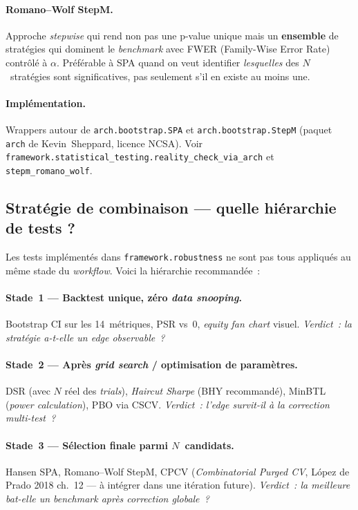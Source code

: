\paragraph{Romano--Wolf StepM.} Approche \emph{stepwise} qui rend non pas une p-value unique mais un \textbf{ensemble} de stratégies qui dominent le \emph{benchmark} avec FWER (Family-Wise Error Rate) contrôlé à $\alpha$. Préférable à SPA quand on veut identifier \emph{lesquelles} des $N$~stratégies sont significatives, pas seulement s'il en existe au moins une.

\paragraph{Implémentation.} Wrappers autour de \texttt{arch.bootstrap.SPA} et \texttt{arch.bootstrap.StepM} (paquet \texttt{arch} de Kevin~Sheppard, licence NCSA). Voir \texttt{framework.statistical\_testing.reality\_check\_via\_arch} et \texttt{stepm\_romano\_wolf}.

\subsection{Stratégie de combinaison --- quelle hiérarchie de tests ?}
\label{app:hierarchy}

Les tests implémentés dans \texttt{framework.robustness} ne sont pas tous appliqués au même stade du \emph{workflow}. Voici la hiérarchie recommandée~:

\paragraph{Stade~1 --- Backtest unique, zéro \emph{data snooping}.} Bootstrap CI sur les 14~métriques, PSR vs~0, \emph{equity fan chart} visuel. \textit{Verdict~: la stratégie a-t-elle un \emph{edge} observable~?}

\paragraph{Stade~2 --- Après \emph{grid search} / optimisation de paramètres.} DSR (avec $N$ réel des \emph{trials}), \emph{Haircut Sharpe} (BHY recommandé), MinBTL (\emph{power calculation}), PBO via CSCV. \textit{Verdict~: l'\emph{edge} survit-il à la correction multi-test~?}

\paragraph{Stade~3 --- Sélection finale parmi $N$~candidats.} Hansen SPA, Romano--Wolf StepM, CPCV (\emph{Combinatorial Purged CV}, L\'opez de Prado 2018 ch.~12 --- à intégrer dans une itération future). \textit{Verdict~: la meilleure bat-elle un benchmark après correction globale~?}

